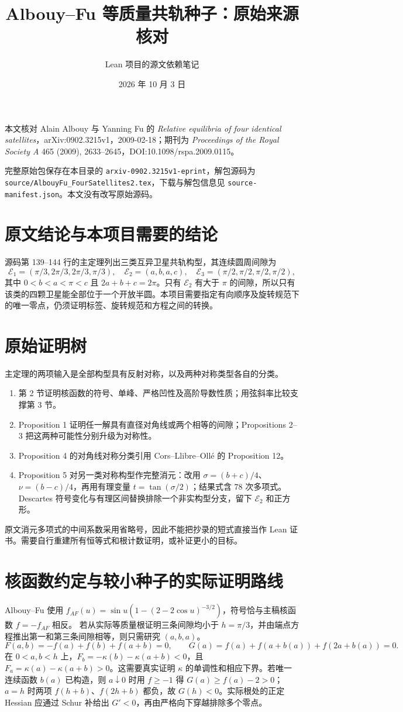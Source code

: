 \documentclass[UTF8,fontset=fandol]{ctexart}
\title{Albouy--Fu 等质量共轨种子：原始来源核对}
\author{Lean 项目的源文依赖笔记}
\date{2026 年 10 月 3 日}
\begin{document}
\maketitle
本文核对 Alain Albouy 与 Yanning Fu 的 \emph{Relative equilibria of four identical satellites}，arXiv:0902.3215v1，2009-02-18；期刊为 \emph{Proceedings of the Royal Society A} 465 (2009), 2633--2645，DOI:10.1098/rspa.2009.0115。

完整原始包保存在本目录的 \texttt{arxiv-0902.3215v1-eprint}，解包源码为 \texttt{source/AlbouyFu\_FourSatellites2.tex}，下载与解包信息见 \texttt{source-manifest.json}。本文没有改写原始源码。

\section*{原文结论与本项目需要的结论}
源码第 139--144 行的主定理列出三类互异卫星共轨构型，其连续圆周间隙为
\[
\mathcal E_1=(\pi/3,2\pi/3,2\pi/3,\pi/3),\quad
\mathcal E_2=(a,b,a,c),\quad
\mathcal E_3=(\pi/2,\pi/2,\pi/2,\pi/2),
\]
其中 $0<b<a<\pi<c$ 且 $2a+b+c=2\pi$。只有 $\mathcal E_2$ 有大于 $\pi$ 的间隙，所以只有该类的四颗卫星能全部位于一个开放半圆。本项目需要指定有向顺序及旋转规范下的唯一零点，仍须证明标签、旋转规范和方程之间的转换。

\section*{原始证明树}
主定理的两项输入是全部构型具有反射对称，以及两种对称类型各自的分类。
\begin{enumerate}
\item 第 2 节证明核函数的符号、单峰、严格凹性及高阶导数性质；用弦斜率比较支撑第 3 节。
\item Proposition 1 证明任一解具有直径对角线或两个相等的间隙；Propositions 2--3 把这两种可能性分别升级为对称性。
\item Proposition 4 的对角线对称分类引用 Cors--Llibre--Oll\'e 的 Proposition 12。
\item Proposition 5 对另一类对称构型作完整消元：改用 $\sigma=(b+c)/4$、$\nu=(b-c)/4$，再用有理变量 $t=\tan(\sigma/2)$；结果式含 78 次多项式。Descartes 符号变化与有理区间替换排除一个非实构型分支，留下 $\mathcal E_2$ 和正方形。
\end{enumerate}
原文消元多项式的中间系数采用省略号，因此不能把抄录的短式直接当作 Lean 证书。需要自行重建所有恒等式和根计数证明，或补证更小的目标。

\section*{核函数约定与较小种子的实际证明路线}
Albouy--Fu 使用 $f_{AF}(u)=\sin u(1-(2-2\cos u)^{-3/2})$，符号恰与主稿核函数 $f=-f_{AF}$ 相反。
若从实际等质量根证明三条间隙均小于 $h=\pi/3$，并由端点方程推出第一和第三条间隙相等，则只需研究 $(a,b,a)$。
\[
F(a,b)=-f(a)+f(b)+f(a+b)=0,\qquad
G(a)=f(a)+f(a+b(a))+f(2a+b(a))=0.
\]
在 $0<a,b<h$ 上，$F_b=-\kappa(b)-\kappa(a+b)<0$，且 $F_a=\kappa(a)-\kappa(a+b)>0$。这需要真实证明 $\kappa$ 的单调性和相应下界。若唯一连续函数 $b(a)$ 已构造，则 $a\downarrow0$ 时用 $f\ge-1$ 得 $G(a)\ge f(a)-2>0$；$a=h$ 时两项 $f(h+b)$、$f(2h+b)$ 都负，故 $G(h)<0$。实际根处的正定 Hessian 应通过 Schur 补给出 $G'<0$，再由严格向下穿越排除多个零点。
\end{document}

